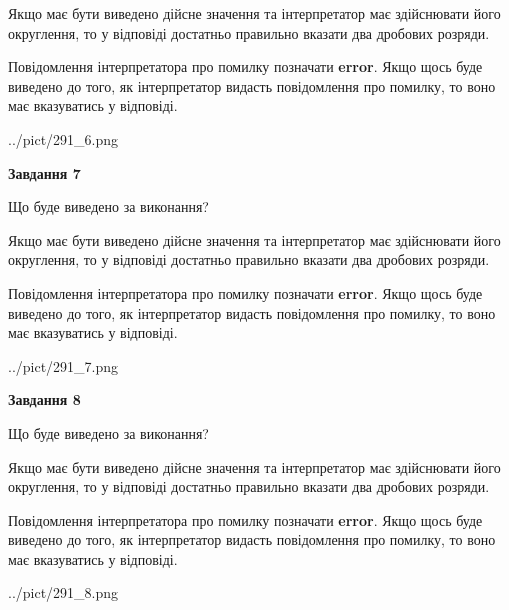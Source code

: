 \documentclass[12pt, ukrainian]{article}
\begin{document}
{\begin {Large}
Якщо має бути виведено дійсне значення та інтерпретатор має здійснювати його округлення, 
то у відповіді достатньо правильно вказати два дробових розряди.

Повідомлення інтерпретатора про помилку позначати \textbf{error}.
Якщо щось буде виведено до того, як інтерпретатор видасть повідомлення про помилку, 
то воно має вказуватись у відповіді. \par

\begin{center}
	{../pict/291_6.png}
\end{center}
\newpage

{\begin {center}\textbf{Завдання 7}\end {center}}\par
Що буде виведено за виконання? \par

Якщо має бути виведено дійсне значення та інтерпретатор має здійснювати його округлення, 
то у відповіді достатньо правильно вказати два дробових розряди.

Повідомлення інтерпретатора про помилку позначати \textbf{error}.
Якщо щось буде виведено до того, як інтерпретатор видасть повідомлення про помилку, 
то воно має вказуватись у відповіді. \par

\begin{center}
	{../pict/291_7.png}
\end{center}
\newpage

{\begin {center}\textbf{Завдання 8}\end {center}}\par
Що буде виведено за виконання? \par

Якщо має бути виведено дійсне значення та інтерпретатор має здійснювати його округлення, 
то у відповіді достатньо правильно вказати два дробових розряди.

Повідомлення інтерпретатора про помилку позначати \textbf{error}.
Якщо щось буде виведено до того, як інтерпретатор видасть повідомлення про помилку, 
то воно має вказуватись у відповіді. \par

\begin{center}
	{../pict/291_8.png}
\end{center}
\newpage


\end{Large}}
\end{document}
